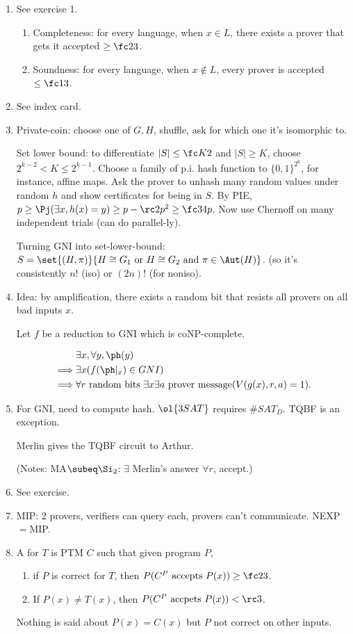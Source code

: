 \begin{enumerate}
\item See exercise 1.
\begin{enumerate}
\item
Completeness: for every language, when $x\in L$, there exists a prover that gets it accepted $\ge \fc 23$.
\item
Soundness: for every language, when $x\nin L$, every prover is accepted $\le \fc 13$.
\end{enumerate}
\item 
See index card.
\item
Private-coin: choose one of $G,H$, shuffle, ask for which one it's isomorphic to.

Set lower bound: to differentiate $|S|\le \fc K2$ and $|S|\ge K$, choose $2^{k-2}<K\le 2^{k-1}$. Choose a family of p.i. hash function to $\{0,1\}^{2^k}$, for instance, affine maps. 
Ask the prover to unhash many random values under random $h$ and show certificates for being in $S$. By PIE, $p\ge \Pj(\exists x, h(x)=y)\ge p-\rc2p^2\ge \fc34p$. Now use Chernoff on many independent trials (can do parallel-ly).

Turning GNI into set-lower-bound: $S=\set{(H,\pi)}{H\cong G_1\text{ or }H\cong G_2\text{ and }\pi\in \Aut(H)}$. (so it's consistently $n!$ (iso) or $(2n)!$ (for noniso).
\item 
Idea: by amplification, there exists a random bit that resists all provers on all bad inputs $x$.

Let $f$ be a reduction to GNI which is coNP-complete.

\begin{align*}
&\exists x, \forall y, \ph(y)\\
\implies & \exists x (f(\ph|_x)\in GNI)\\
\implies & \forall r \text{ random bits }\exists x\exists a\text{ prover message} (V(g(x),r,a)=1).
\end{align*}
\item For GNI, need to compute hash. $\ol{3SAT}$ requires $\#SAT_D$. TQBF is an exception. 

Merlin gives the TQBF circuit to Arthur.

(Notes: MA$\subeq\Si_2$: $\exists$ Merlin's answer $\forall r$,  accept.)
\item See exercise.
\item MIP: 2 provers, verifiers can query each, provers can't communicate. NEXP$=$MIP.
\item A  for $T$ is PTM $C$ such that given program $P$, 
\begin{enumerate}
\item
if $P$ is correct for $T$, then $P(C^P\text{ accepts }P(x))\ge \fc 23$.
\item If $P(x)\ne T(x)$, then $P(C^P\text{ accpets }P(x))<\rc3$.
\end{enumerate}
Nothing is said about $P(x)=C(x)$ but $P$ not correct on other inputs.


\end{enumerate}
